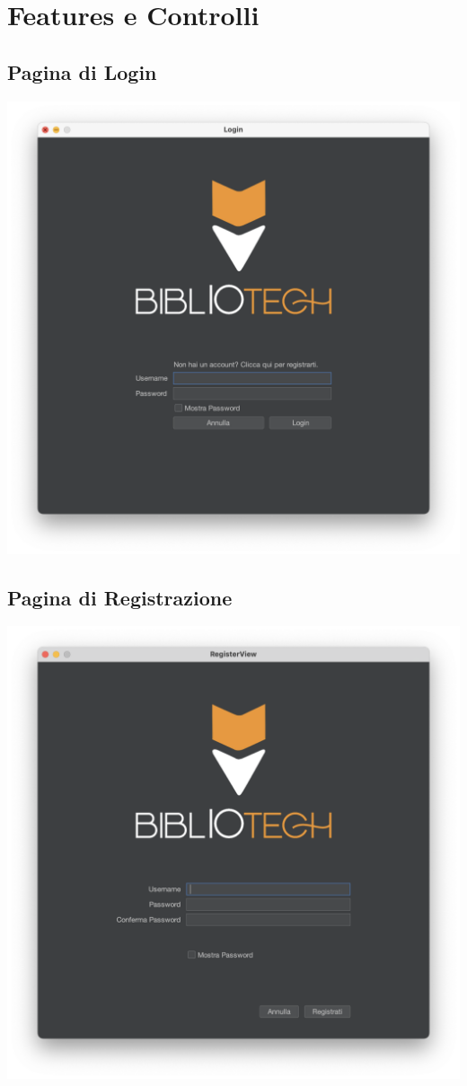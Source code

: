 \chapter{Features e Controlli}


\section{Pagina di Login}
\includegraphics[scale=0.45]{Immagini/Schermate/Login_Register/LoginPage.png}


\section{Pagina di Registrazione}
\includegraphics[scale=0.45]{Immagini/Schermate/Login_Register/RegisterPage.png}

